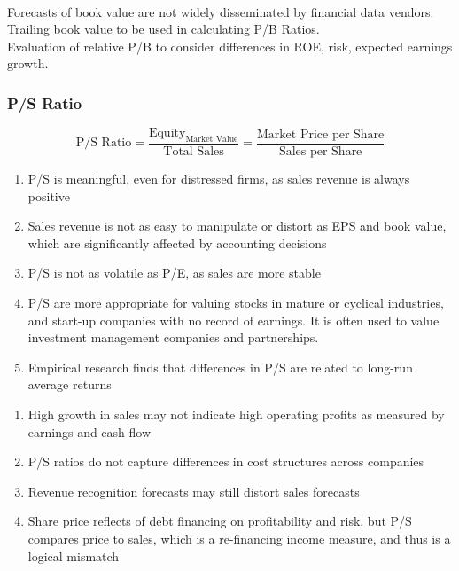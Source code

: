 \begin{remark} \\
Forecasts of book value are not widely disseminated by financial data vendors.\\
Trailing book value to be used in calculating P/B Ratios.\\
Evaluation of relative P/B to consider differences in ROE, risk, expected earnings growth.
\end{remark}

\subsubsection{P/S Ratio}

\begin{definition} 
\begin{equation}
\text{P/S Ratio} = \frac{\text{Equity}_{\text{Market Value}}}{\text{Total Sales}} = \frac{\text{Market Price per Share}}{\text{Sales per Share}} \nonumber
\end{equation}
\end{definition}

\begin{remark} 
\begin{enumerate}[label=\roman*.]
\setlength{\itemsep}{0pt}
\item P/S is meaningful, even for distressed firms, as sales revenue is always positive
\item Sales revenue is not as easy to manipulate or distort as EPS and book value, which are significantly affected by accounting decisions
\item P/S is not as volatile as P/E, as sales are more stable
\item P/S are more appropriate for valuing stocks in mature or cyclical industries, and start-up companies with no record of earnings. It is often used to value investment management companies and partnerships.
\item Empirical research finds that differences in P/S are related to long-run average returns
\end{enumerate}
\end{remark}

\begin{remark} 
\begin{enumerate}[label=\roman*.]
\setlength{\itemsep}{0pt}
\item High growth in sales may not indicate high operating profits as measured by earnings and cash flow
\item P/S ratios do not capture differences in cost structures across companies
\item Revenue recognition forecasts may still distort sales forecasts
\item Share price reflects of debt financing on profitability and risk, but P/S compares price to sales, which is a re-financing income measure, and thus is a logical mismatch
\end{enumerate}
\end{remark}

